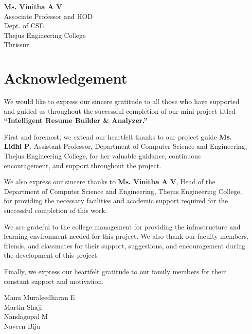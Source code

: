 \documentclass[12pt,a4paper]{report}
\begin{document}
\vspace{1.4cm}

\begin{center}
\textbf{Ms. Vinitha A V}\\
Associate Professor and HOD\\
Dept. of CSE\\
Thejus Engineering College\\
Thrissur
\end{center}

\newpage
\setcounter{page}{1}
\chapter*{Acknowledgement}

We would like to express our sincere gratitude to all those who have supported and guided us throughout the successful completion of our mini project titled \textbf{“Intelligent Resume Builder \& Analyzer.”}

First and foremost, we extend our heartfelt thanks to our project guide \textbf{Ms. Lidhi P}, Assistant Professor, Department of Computer Science and Engineering, Thejus Engineering College, for her valuable guidance, continuous encouragement, and support throughout the project.

We also express our sincere thanks to \textbf{Ms. Vinitha A V}, Head of the Department of Computer Science and Engineering, Thejus Engineering College, for providing the necessary facilities and academic support required for the successful completion of this work.

We are grateful to the college management for providing the infrastructure and learning environment needed for this project. We also thank our faculty members, friends, and classmates for their support, suggestions, and encouragement during the development of this project.

Finally, we express our heartfelt gratitude to our family members for their constant support and motivation.

\vspace{0.5cm}

\begin{flushright}
Manu Muraleedharan E\\
Martin Shaji\\
Nandagopal M\\
Naveen Biju\\
\end{flushright}
\end{document}
